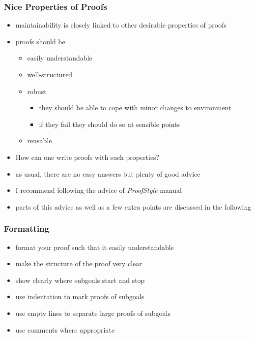 \begin{frame}
\frametitle{Nice Properties of Proofs}

\begin{itemize}
\item maintainability is closely linked to other desirable properties of proofs
\item proofs should be
\begin{itemize}
\item easily understandable
\item well-structured
\item robust
\begin{itemize}
\item they should be able to cope with minor changes to environment
\item if they fail they should do so at sensible points
\end{itemize}
\item reusable
\end{itemize}
\item How can one write proofs with such properties?
\item as usual, there are no easy answers but plenty of good advice
\item I recommend following the advice of \emph{ProofStyle} manual
\item parts of this advice as well as a few extra points are discussed in the following
\end{itemize}
\end{frame}


\begin{frame}
\frametitle{Formatting}

\begin{itemize}
\item format your proof such that it easily understandable
\item make the structure of the proof very clear
\item \alert{show clearly where subgoals start and stop}
\item use indentation to mark proofs of subgoals
\item use empty lines to separate large proofs of subgoals
\item use comments where appropriate
\end{itemize}

\end{frame}

